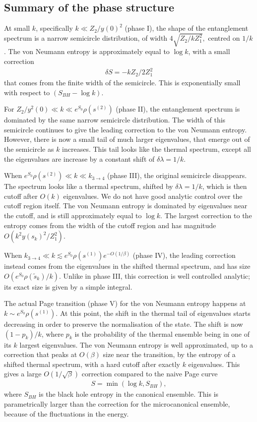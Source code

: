 \documentclass[12pt]{article}
\renewcommand{\tilde}{\widetilde}
\newcommand{\smax}{s_k}
\newcommand{\stilde}{\tilde{s}_k}
\numberwithin{equation}{section}
\begin{document}
\subsection*{Summary of the phase structure}

At small $k$, specifically $k \ll Z_2/y(0)^2$ (phase I), the shape of the entanglement spectrum is a narrow semicircle distribution, of width $4 \sqrt{ Z_2 / k Z_1^2},$ 
centred on $1/k$. The von Neumann entropy is approximately equal to $\log k$, with a small correction 
\begin{align}
\delta S = - k Z_2 /2 Z_1^2
\end{align}
 that comes from the finite width of the semicircle. This is exponentially small with respect to $(S_{BH} - \log k)$.

For $Z_2/y^2(0) \ll k \ll e^{S_0} \rho( s^{(2)})$ (phase II), the entanglement spectrum is dominated by the same narrow semicircle distribution. The width of this semicircle continues to give the leading correction to the von Neumann entropy. However, there is now a small tail of much larger eigenvalues, that emerge out of the semicircle as $k$ increases. This tail looks like the thermal spectrum, except all the eigenvalues are increase by a constant shift of $\delta \lambda = 1/k$.

When $e^{S_0} \rho( s^{(2)}) \ll k \ll k_{3 \to 4}$ (phase III), the original semicircle disappears. The spectrum looks like a thermal spectrum, shifted by $\delta \lambda = 1/k$, which is then cutoff after $O(k)$ eigenvalues. We do not have good analytic control over the cutoff region itself. The von Neumann entropy is dominated by eigenvalues near the cutoff, and is still approximately equal to $\log k$. The largest correction to the entropy comes from the width of the cutoff region and has magnitude $O(k^2 y(\smax)^2/Z_1^2)$.

When $k_{3 \to 4} \ll k \lesssim e^{S_0} \rho( s^{(1)})e^{-O(1/\beta)}$ (phase IV), the leading correction instead comes from the eigenvalues in the shifted thermal spectrum, and has size $O(e^{S_0} \rho(\stilde)/k)$. Unlike in phase III, this correction is well controlled analytic; its exact size is given by a simple integral.

The actual Page transition (phase V) for the von Neumann entropy happens at $k \sim e^{S_0} \rho(s^{(1)})$. At this point, the shift in the thermal tail of eigenvalues starts decreasing in order to preserve the normalisation of the state. The shift is now $(1- p_k)/k$, where $p_k$ is the probability of the thermal ensemble being in one of its $k$ largest eigenvalues. The von Neumann entropy is well approximated, up to a correction that peaks at $O(\beta)$ size near the transition, by the entropy of a shifted thermal spectrum, with a hard cutoff after exactly $k$ eigenvalues. This gives a large $O(1/\sqrt{\beta})$ correction compared to the naive Page curve
\begin{align} \label{eq:naivepagesummary}
S = \min\left( \log k, S_{BH}\right),
\end{align}
where $S_{BH}$ is the black hole entropy in the canonical ensemble. This is parametrically larger than the correction for the microcanonical ensemble, because of the fluctuations in the energy.
\end{document}
